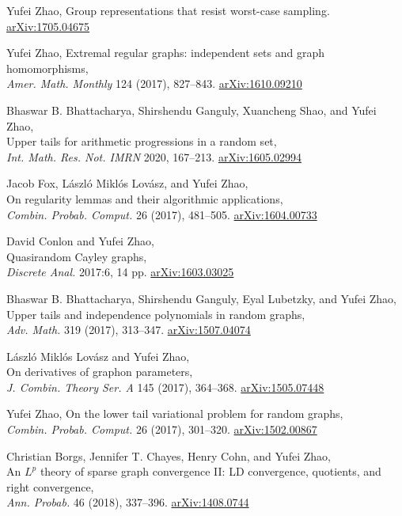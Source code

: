 \documentclass[11pt]{amsart}
\newcommand{\arXiv}[1]{\href{http://arxiv.org/abs/#1}{\color{black!50}\footnotesize\ttfamily  arXiv:#1}}
\renewcommand{\j}[1]{{\frenchspacing\itshape #1}}
\begin{document}
\begin{etaremune}[leftmargin=0.3in,itemsep=4pt,topsep=0pt,partopsep=0pt,parsep=0pt]
\item Yufei Zhao, Group representations that resist worst-case sampling. \arXiv{1705.04675}

\item Yufei Zhao, Extremal regular graphs: independent sets and graph homomorphisms, \\
  \j{Amer. Math. Monthly} 124 (2017), 827--843.
  \arXiv{1610.09210}

\item Bhaswar B. Bhattacharya, Shirshendu Ganguly, Xuancheng Shao, and Yufei Zhao, \\
  Upper tails for arithmetic progressions in a random set, \\
  \j{Int. Math. Res. Not. IMRN} 2020, 167--213. 
  \arXiv{1605.02994}

\item Jacob Fox, L\'aszl\'o Mikl\'os Lov\'asz, and Yufei Zhao, \\
  On regularity lemmas and their algorithmic applications, \\
  \j{Combin. Probab. Comput.} 26 (2017), 481--505. 
  \arXiv{1604.00733}

\item David Conlon and Yufei Zhao, \\
  Quasirandom Cayley graphs, \\
  \j{Discrete Anal.} 2017:6, 14 pp.
  \arXiv{1603.03025}

\item Bhaswar B. Bhattacharya, Shirshendu Ganguly, Eyal Lubetzky, and Yufei Zhao, \\
  Upper tails and independence polynomials in random graphs,
  \\
  \j{Adv. Math.}  319 (2017), 313--347.
  \arXiv{1507.04074}

\item L\'aszl\'o Mikl\'os Lov\'asz and Yufei Zhao, \\
  On derivatives of graphon parameters, \\
  \j{J. Combin. Theory Ser. A} 145 (2017), 364--368.
  \arXiv{1505.07448}

\item Yufei Zhao,
  On the lower tail variational problem for random graphs, \\
  \j{Combin. Probab. Comput.} 26 (2017), 301--320.
  \arXiv{1502.00867}

\item Christian Borgs, Jennifer T. Chayes, Henry Cohn, and Yufei Zhao, \\
  An $L^p$ theory of sparse graph convergence II:
  LD convergence, quotients, and right convergence,
  \\
  \j{Ann. Probab.} 46 (2018), 337--396.
  \arXiv{1408.0744}


\end{etaremune}
\end{document}
